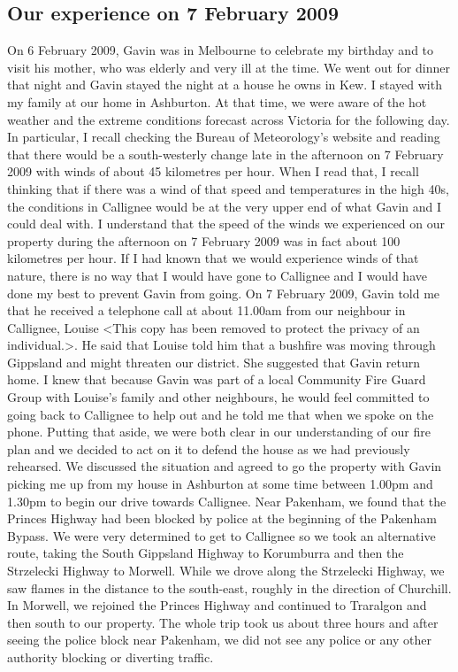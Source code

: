 \documentclass[a4paper]{article}
\begin{document}
    \subsection{Our experience on 7 February 2009}

        On 6 February 2009, Gavin was in Melbourne to celebrate my birthday and to visit his mother, who was elderly and very ill at the time. We went out for dinner that night and Gavin stayed the night at a house he owns in Kew. I stayed with my family at our home in Ashburton. At that time, we were aware of the hot weather and the extreme conditions forecast across Victoria for the following day. In particular, I recall checking the Bureau of Meteorology's website and reading that there would be a south-westerly change late in the afternoon on 7 February 2009 with winds of about 45 kilometres per hour. When I read that, I recall thinking that if there was a wind of that speed and temperatures in the high 40s, the conditions in Callignee would be at the very upper end of what Gavin and I could deal with. I understand that the speed of the winds we experienced on our property during the afternoon on 7 February 2009 was in fact about 100 kilometres per hour. If I had known that we would experience winds of that nature, there is no way that I would have gone to Callignee and I would have done my best to prevent Gavin from going.
        On 7 February 2009, Gavin told me that he received a telephone call at about 11.00am from our neighbour in Callignee, Louise <This copy has been removed to protect the privacy of an individual.>. He said that Louise told him that a bushfire was moving through Gippsland and might threaten our district. She suggested that Gavin return home. I knew that because Gavin was part of a local Community Fire Guard Group with Louise's family and other neighbours, he would feel committed to going back to Callignee to help out and he told me that when we spoke on the phone. Putting that aside, we were both clear in our understanding of our fire plan and we decided to act on it to defend the house as we had previously rehearsed. We discussed the situation and agreed to go the property with Gavin picking me up from my house in Ashburton at some time between 1.00pm and 1.30pm to begin our drive towards Callignee.
        Near Pakenham, we found that the Princes Highway had been blocked by police at the beginning of the Pakenham Bypass. We were very determined to get to Callignee so we took an alternative route, taking the South Gippsland Highway to Korumburra and then the Strzelecki Highway to Morwell. While we drove along the Strzelecki Highway, we saw flames in the distance to the south-east, roughly in the direction of Churchill. In Morwell, we rejoined the Princes Highway and continued to Traralgon and then south to our property. The whole trip took us about three hours and after seeing the police block near Pakenham, we did not see any police or any other authority blocking or diverting traffic.
\end{document}
